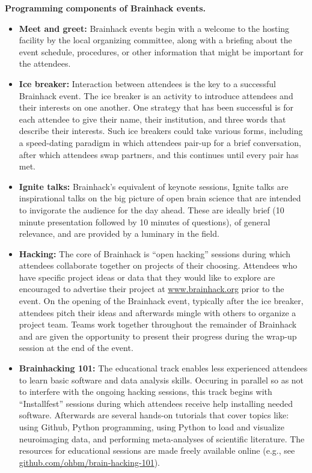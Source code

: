 \begin{table}[!ht]
\caption{{\bf Programming components of Brainhack events.}\label{tab4}}
\hline
    \begin{itemize}
    \item
        \textbf{Meet and greet:} Brainhack events begin with a welcome to the hosting facility by the local organizing committee, along with a briefing about the event schedule, procedures, or other information that might be important for the attendees.
    \item
        \textbf{Ice breaker:} Interaction between attendees is the key to a successful Brainhack event. The ice breaker is an activity to introduce attendees and their interests on one another. One strategy that has been successful is for each attendee to give their name, their institution, and three words that describe their interests. Such ice breakers could take various forms, including a speed-dating paradigm in which attendees pair-up for a brief conversation, after which attendees swap partners, and this continues until every pair has met.
    \item
        \textbf{Ignite talks:} Brainhack's equivalent of keynote sessions, Ignite talks are inspirational talks on the big picture of open brain science that are intended to invigorate the audience for the day ahead. These are ideally brief (10 minute presentation followed by 10 minutes of questions), of general relevance, and are provided by a luminary in the field.
    \item
        \textbf{Hacking:} The core of Brainhack is ``open hacking'' sessions during which attendees collaborate together on projects of their choosing. Attendees who have specific project ideas or data that they would like to explore are encouraged to advertise their project at \href{http://www.brainhack.org}{www.brainhack.org} prior to the event. On the opening of the Brainhack event, typically after the ice breaker, attendees pitch their ideas and afterwards mingle with others to organize a project team. Teams work together throughout the remainder of Brainhack and are given the opportunity to present their progress during the wrap-up session at the end of the event.
    \item
        \textbf{Brainhacking 101:} The educational track enables less experienced attendees to learn basic software and data analysis skills. Occuring in parallel so as not to interfere with the ongoing hacking sessions, this track begins with ``Installfest'' sessions during which attendees receive help installing needed software. Afterwards are several hands-on tutorials that cover topics like: using Github, Python programming, using Python to load and visualize neuroimaging data, and performing meta-analyses of scientific literature. The resources for educational sessions are made freely available online (e.g., see \href{https://github.com/ohbm/brain-hacking-101}{github.com/ohbm/brain-hacking-101}).

\end{itemize}
\end{table}
